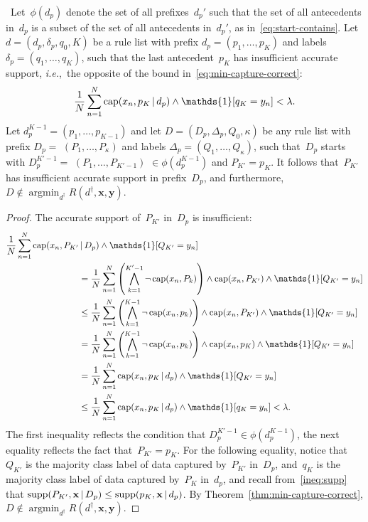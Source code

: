 \documentclass[twoside,11pt]{article}
\def\ie{{\it i.e.},~}
\def\one{\mathds{1}}
\newcommand{\x}{\mathbf{x}}
\newcommand{\y}{\mathbf{y}}
\def\RL{{d}}
\def\Prefix{d_p}
\def\Labels{\delta_p}
\def\Default{q_0}
\def\RLB{{D}}
\def\PrefixB{D_p}
\def\LabelsB{\Delta_p}
\def\DefaultB{Q_0}
\def\Obj{R}
\def\Reg{{\lambda}}
\def\Cap{\textnormal{cap}}
\def\Supp{\textnormal{supp}}
\def\StartContains{\phi}
\DeclareMathOperator*{\argmin}{argmin}
\def\one{\mathds{1}}
\newcommand{\nn}{\nonumber}
\newcommand{\given}{\,|\,}
\begin{document}
\begin{arxiv}
\begin{proposition}
\label{prop:min-capture-correct}
~Let~$\StartContains(\Prefix)$ denote the set of all
prefixes~$\Prefix'$ such that
the set of all antecedents in~$\Prefix$ is a subset of
the set of all antecedents in~$\Prefix'$,
as in~\eqref{eq:start-contains}.
%
Let ${\RL = (\Prefix, \Labels, \Default, K)}$ be a rule list
with prefix ${\Prefix = (p_1, \dots, p_{K})}$
and labels ${\Labels = (q_1, \dots, q_{K})}$, such that
the last antecedent~$p_{K}$ has insufficient accurate support,
\ie the opposite of the bound in~\eqref{eq:min-capture-correct}:
\begin{align}
\frac{1}{N} \sum_{n=1}^N \Cap(x_n, p_K \given \Prefix) \wedge \one [ q_K = y_n ]
< \Reg. \nn
\end{align}
%
Let ${\Prefix^{K-1} = (p_1, \dots, p_{K-1})}$
and let ${\RLB = (\PrefixB, \LabelsB, \DefaultB, \kappa)}$
be any rule list with prefix ${\PrefixB =}$ ${(P_1, \dots, P_{\kappa})}$
and labels ${\LabelsB = (Q_1, \dots, Q_{\kappa})}$,
such that~$\PrefixB$ starts with ${\PrefixB^{K'-1} =}$
${(P_1, \dots, P_{K'-1})}$ ${\in \StartContains(\Prefix^{K-1})}$
and ${P_{K'} = p_{K}}$.
%
It follows that~$P_{K'}$ has insufficient accurate support in
prefix~$\PrefixB$, and furthermore,
${\RLB \notin \argmin_{\RL^\dagger} \Obj(\RL^\dagger, \x, \y)}$.
\end{proposition}

\begin{proof}
The accurate support of~$P_{K'}$ in~$\PrefixB$ is insufficient:
\begin{align}
\frac{1}{N} \sum_{n=1}^N \Cap(x_n, P_{K'} &\given \PrefixB) \wedge \one [ Q_{K'} = y_n ] \nn \\
&= \frac{1}{N} \sum_{n=1}^N \left( \bigwedge_{k=1}^{K'-1} \neg\, \Cap(x_n, P_k) \right)
   \wedge \Cap(x_n, P_{K'}) \wedge \one [ Q_{K'} = y_n ] \nn \\
&\le \frac{1}{N} \sum_{n=1}^N \left( \bigwedge_{k=1}^{K-1} \neg\, \Cap(x_n, p_k) \right)
   \wedge \Cap(x_n, P_{K'}) \wedge \one [ Q_{K'} = y_n ] \nn \\
&= \frac{1}{N} \sum_{n=1}^N \left( \bigwedge_{k=1}^{K-1} \neg\, \Cap(x_n, p_k) \right)
   \wedge \Cap(x_n, p_K) \wedge \one [ Q_{K'} = y_n ] \nn \\
&= \frac{1}{N} \sum_{n=1}^N \Cap(x_n, p_K \given \Prefix) \wedge \one [ Q_{K'} = y_n ] \nn \\
&\le \frac{1}{N} \sum_{n=1}^N \Cap(x_n, p_K \given \Prefix) \wedge \one [ q_{K} = y_n ]
< \Reg. \nn
\end{align}
The first inequality reflects the condition that
${\PrefixB^{K'-1} \in \StartContains(\Prefix^{K-1})}$,
the next equality reflects the fact that~${P_{K'} = p_K}$.
%
For the following equality, notice that~$Q_{K'}$ is the majority
class label of data captured by~$P_{K'}$ in~$\PrefixB$, and~$q_K$
is the majority class label of data captured by~$P_K$ in~$\Prefix$,
and recall from~\eqref{ineq:supp} that
${\Supp(P_{K'}, \x \given \PrefixB) \le \Supp(p_{K}, \x \given \Prefix)}$.
%
By Theorem~\ref{thm:min-capture-correct},
${\RLB \notin \argmin_{\RL^\dagger} \Obj(\RL^\dagger, \x, \y)}$.
\end{proof}


\end{arxiv}
\end{document}
